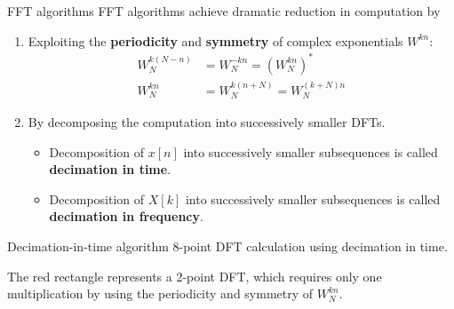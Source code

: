 \documentclass[10pt]{beamer}
\begin{document}
% 
\begin{frame}{FFT algorithms}
	FFT algorithms achieve dramatic reduction in computation by
	\begin{enumerate}
		\item Exploiting the \textbf{periodicity} and \textbf{symmetry} of complex exponentials $W^{kn}$:
		\begin{align*}
		W_N^{k(N-n)} &= W_N^{-kn} = (W_N^{kn})^* \tag{complex conjugate symmetry} \\
		W_N^{kn} &= W_N^{k(n+N)} = W_N^{(k+N)n}  \tag{periodicity in $n$ and $k$}
		\end{align*}
		\item By decomposing the computation into successively smaller DFTs. 
		\begin{itemize}
			\item Decomposition of $x[n]$ into successively smaller subsequences is called \textbf{decimation in time}.
			\item Decomposition of $X[k]$ into successively smaller subsequences is called \textbf{decimation in frequency}.
		\end{itemize}
	\end{enumerate}
\end{frame}

% 
\begin{frame}{Decimation-in-time algorithm}
8-point DFT calculation using decimation in time.

The red rectangle represents a 2-point DFT, which requires only one multiplication by using the periodicity and symmetry of $W_N^{kn}$.
\begin{center}
\end{center}

\end{frame}
\end{document}
